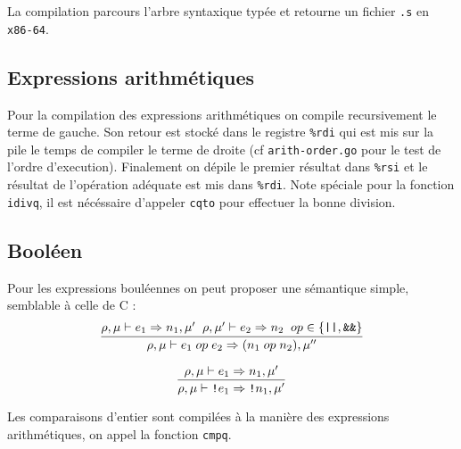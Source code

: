 \documentclass[11pt,a4paper]{article}
\begin{document}
La compilation parcours l'arbre syntaxique typée et retourne un fichier \verb|.s| en \verb|x86-64|.

\subsection{Expressions arithmétiques}

Pour la compilation des expressions arithmétiques on compile recursivement le terme de gauche. Son retour est stocké dans le registre \verb|%rdi| qui est mis sur la pile le temps de compiler le terme de droite (cf \verb|arith-order.go| pour le test de l'ordre d'execution). Finalement on dépile le premier résultat dans \verb|%rsi| et le résultat de l'opération adéquate est mis dans \verb|%rdi|.
Note spéciale pour la fonction \verb|idivq|, il est nécéssaire d'appeler \verb|cqto| pour effectuer la bonne division.

\subsection{Booléen}

Pour les expressions bouléennes on peut proposer une sémantique simple, semblable à celle de C :\\


$$\infer{\rho, \mu \vdash e_1 \; op \; e_2 \Rightarrow (n_1 \; op \; n_2) , \mu ''}{\rho, \mu \vdash e_1 \Rightarrow n_1, \mu ' \; \; \rho, \mu ' \vdash e_2 \Rightarrow n_2 \; \; op \in \{ \text{\texttt{||}}, \text{\texttt{\&\&}} \}}$$

$$\infer{\rho, \mu \vdash \text{\texttt{!}} e_1 \Rightarrow \text{\texttt{!}} n_1 , \mu '}{\rho, \mu \vdash e_1 \Rightarrow n_1, \mu '}$$


Les comparaisons d'entier sont compilées à la manière des expressions arithmétiques, on appel la fonction \verb|cmpq|.
\end{document}
